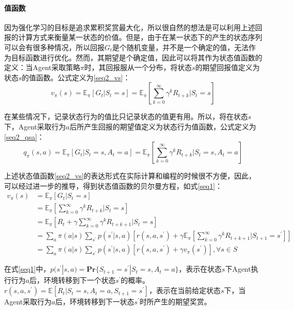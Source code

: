 \paragraph{值函数}

因为强化学习的目标是追求累积奖赏最大化，所以很自然的想法是可以利用上述回报的计算方式来衡量某一状态的价值。但是，由于在某一状态下的产生的状态序列可以会有很多种情况，所以回报$G_{t}$是个随机变量，并不是一个确定的值，无法作为目标函数进行优化。然而，其期望是个确定值，因此可以将其作为状态值函数的定义：当Agent采取策略$\pi$时，其回报服从一个分布，将状态$s$的期望回报值定义为状态$s$的值函数。公式定义为\eqref{seq2_vs}：
\begin{equation}
\label{seq2_vs}
v_{\pi}(s)=\mathbb{E}_{\pi}[G_{t}|S_t=s]=\mathbb{E}_{\pi}[\sum_{k=0}^{\infty}\gamma^{k}R_{t+k}|S_t=s]
\end{equation}


在某些情况下，记录状态行为的值比只记录状态的值更有用。所以，将在状态$s$下，Agent采取行为$a$后所产生回报的期望值定义为状态行为值函数，公式定义为\eqref{seq2_qsa}：
\begin{equation}
\label{seq2_qsa}
q_{\pi}(s,a)=\mathbb{E}_{\pi}[G_{t}|S_t=s,A_t=a]
=\mathbb{E}_{\pi}[\sum_{k=0}^{\infty}\gamma^{k}R_{t+k}|S_t=s,A_t=a]
\end{equation}

上述状态值函数\eqref{seq2_vs}的表达形式在实际计算和编程的时候很不方便，因此，可以经过进一步的推导，得到状态值函数的贝尔曼方程，如式\eqref{seq1}：
\begin{equation}
\label{seq1}
\begin{aligned}
v_{\pi}(s)&=\mathbb{E}_{\pi}[G_{t}|S_t=s]\\
&=\mathbb{E}_{\pi}[\sum_{k=0}^{\infty}\gamma^{k}R_{t+k} | S_t=s]\\
&=\mathbb{E}_{\pi}[R_{t} + \gamma \sum_{k=0}^{\infty}\gamma^{k}R_{t+k+1}|S_t=s]\\
&=\sum_{a}\pi(a|s)\sum_{s^{'}}p(s^{'}|s,a)[r(s,a,s^{'}) + \gamma \mathbb{E}_{\pi}[\sum_{k=0}^{\infty}\gamma^{k} R_{t+k+1} |S_{t+1}=s^{'}]]\\
&=\sum_{a}\pi(a|s)\sum_{s^{'}}p(s^{'}|s,a)[r(s,a,s^{'})+\gamma v_{\pi}(s^{'})], \forall s \in S
\end{aligned}
\end{equation}

在式\eqref{seq1}中，$p(s^{'}|s,a) = \bm{\text{Pr}}\{S_{t+1}=s^{'}|S_{t}=s, A_{t}=a\}$，表示在状态$s$下Agent执行行为$a$后，环境转移到下一个状态$s^{'}$的概率。$r(s,a,s^{'})=\mathbb{E}[R_{t}|S_{t}=s,A_{t}=a,S_{t+1}=s^{'}]
$，表示在当前给定状态$s$下，当Agent采取行为$a$后，环境转移到下一状态$s^{'}$时所产生的期望奖赏。

